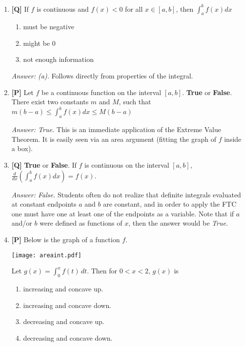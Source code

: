 \documentclass[12pt]{article}
\begin{document}
\begin{enumerate}

\item {\bf [Q]} If $f$ is continuous and $f(x)<0$ for all $x \in [a,b]$, then $\int_a^b {f(x)}dx$
\begin {enumerate}
\item must be negative
\item might be 0
\item not enough information
\end{enumerate}

{\it Answer: (a).} Follows directly from properties of the integral.

\bigskip

\item {\bf [P]} Let $f$ be a continuous function on the interval $[a,b]$. \textbf{True} or \textbf{False}. There exist two
constants $m$ and $M$, such that $m(b-a)\le \int_a^b {f(x)}dx \le M(b-a)$

{\it Answer: True.} This is an immediate application of the
Extreme Value Theorem. It is easily seen via an area argument
(fitting the graph of $f$ inside a box).

\item {\bf [Q]}
\textbf{True} or \textbf{False}. If $f$ is continuous on the interval
$[a,b]$, $\frac{d}{dx}\left( \int_a^b f(x)dx\right)=f(x)$.

{\it Answer: False.} Students often do not realize that definite
integrals evaluated at constant endpoints $a$ and $b$ are constant, and in
order to apply the FTC one must have one at least one of the
endpoints as a variable. Note that if $a$ and/or $b$ were defined as functions of $x$, then the answer would be {\it True}.

\bigskip

\item {\bf [P]} Below is the graph of a function $f$.

\begin{center}
\texttt{[image: areaint.pdf]}
\end{center}

Let $\displaystyle{g(x)=\int_0^x f(t) \, dt.}$ Then for $0 < x <
2$, $g(x)$ is
\begin{enumerate}
\item increasing and concave up.
\item increasing and concave down.
\item decreasing and concave up.
\item decreasing and concave down.
\end{enumerate}


\end{enumerate}
\end{document}
